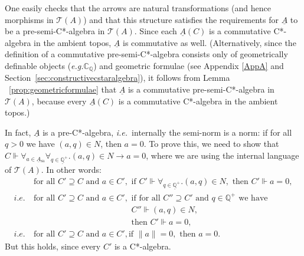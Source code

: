 \documentclass[12pt]{article}
\newcommand{\Q}{\mathbb{Q}}
\newcommand{\alg}[1]{\ensuremath{#1}}
\newcommand{\functor}[1]{\ensuremath{\underline{#1}}}
\newcommand{\cpxrat}{\ensuremath{\field{C}_\field{Q}}}
\newcommand{\asstopos}{\ensuremath{\mathcal{T}}}
\newcommand{\sa}{\ensuremath{_{\mathrm{sa}}}}
\newcommand{\field}[1]{\ensuremath{\mathbb{#1}}}
\newcommand{\uA}{\underline{A}}
\newcommand{\TA}{\mathcal{T}(A)}
\newcommand{\ie}{\textit{i.e.}}
\newcommand{\eg}{\textit{e.g.}}
\renewcommand{\TA}{\asstopos(\alg{A})}
\newenvironment{proof}[1][Proof]%
{ \begin{trivlist}%
  \item[\hskip \labelsep {\bfseries #1}]%
}%
{ \end{trivlist}%
}
\begin{document}
\begin{proof}
One easily checks that the arrows are natural transformations (and
hence morphisms in $\asstopos(\alg{A})$) and that this structure
satisfies the requirements for $\functor{\alg{A}}$ to be a
 pre-semi-C*-algebra in $\asstopos(\alg{A})$. Since each
 $\functor{\alg{A}}(C)$ is a commutative C*-algebra in the ambient
  topos, $\functor{\alg{A}}$ is commutative as well. (Alternatively, since the
definition of a commutative pre-semi-C*-algebra consists only of
  geometrically definable objects
  (\eg \cpxrat) and geometric formulae (see Appendix \ref{AppA} and
  Section~\ref{sec:constructivecstaralgebra}), it follows from
  Lemma ~\ref{prop:geometricformulae} that $\functor{\alg{A}}$ is a
  commutative pre-semi-C*-algebra in $\asstopos(\alg{A})$, because every
  $\functor{\alg{A}}(C)$ is a commutative C*-algebra in the ambient
  topos.)

  In fact, $\functor{\alg{A}}$ is a pre-C*-algebra, \ie\ internally the
  semi-norm is a norm: if for all $q>0$ we have $(a,q)\in N$, then
  $a=0$. To prove this, we need to show that $C\Vdash \forall_{a \in
  \uA\sa} \forall_{q \in \underline{\Q}^+}. (a,q)\in N \rightarrow
  a=0$, where we are using the internal language of $\TA$. In other words:
  \begin{align*}
      & \mbox{for all }C'\supseteq C\mbox{ and }a \in C', \mbox{ if
      }C'\Vdash \forall_{q \in \underline{\Q}^+}.(a,q)
     \in N,\mbox{ then }C'\Vdash a=0, \\
     \ie\ & \mbox{for all }C'\supseteq C\mbox{ and }a \in C', \mbox{ if
     for all }C''\supseteq
     C'\mbox{ and }q \in \Q^+\mbox{ we have } \\ 
        & \phantom{\mbox{ for all }C'\supseteq C\mbox{ and }a \in C',}
        C''\Vdash (a,q)\in N,\\
         & \phantom{\mbox{ for all }C'\supseteq C\mbox{ and }a \in C',
         }\mbox{then }
         C'\Vdash a=0, \\
     \ie\ & \mbox{for all }C' \supseteq C\mbox{ and }a \in C', \mbox{
     if }\|a\|=0, \mbox{ then }a=0.
  \end{align*}
  But this holds, since every $C'$ is a C*-algebra.


\end{proof}
\end{document}
